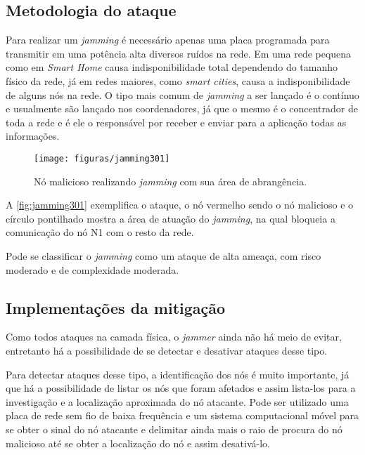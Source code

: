 \subsection{Metodologia do ataque} 
\par Para realizar um \emph{jamming} \'e necess\'ario apenas uma placa programada para transmitir em uma pot\^encia alta diversos ru\'idos na rede. Em uma rede pequena como em \emph{Smart Home} causa indisponibilidade total dependendo do tamanho f\'isico da rede, j\'a em redes maiores, como \emph{smart cities}, causa a indisponibilidade de alguns n\'os na rede. O tipo mais comum de \emph{jamming} a ser lan\c{c}ado \'e o cont\'inuo e usualmente s\~ao lan\c{c}ado nos coordenadores, j\'a que o mesmo \'e o concentrador de toda a rede e \'e ele o respons\'avel por receber e enviar para a aplica\c{c}\~ao todas as informa\c{c}\~oes.

\begin{figure}[ht]
	\centering
	\caption{N\'o malicioso realizando \emph{jamming} com sua \'area de abrang\^encia.}
	\texttt{[image: figuras/jamming301]}
    \label{fig:jamming301}
\end{figure}

\par A \autoref{fig:jamming301} exemplifica o ataque, o n\'o vermelho sendo o n\'o malicioso e o c\'irculo pontilhado mostra a \'area de atua\c{c}\~ao do \emph{jamming}, na qual bloqueia a comunica\c{c}\~ao do n\'o N1 com o resto da rede.

\par Pode se classificar o \emph{jamming} como um ataque de alta amea\c{c}a, com risco moderado e de complexidade moderada.

\subsection{Implementações da mitigação}
\par Como todos ataques na camada física, o \emph{jammer} ainda não há meio de evitar, entretanto há a possibilidade de se detectar e desativar ataques desse tipo.

\par Para detectar ataques desse tipo, a identificação dos nós é muito importante, j\'a que há a possibilidade de listar os nós que foram afetados e assim lista-los para a investigação e a localização aproximada do nó atacante. Pode ser utilizado uma placa de rede sem fio de baixa frequência e um sistema computacional móvel para se obter o sinal do nó atacante e delimitar ainda mais o raio de procura do nó malicioso até se obter a localização do nó e assim desativá-lo.

